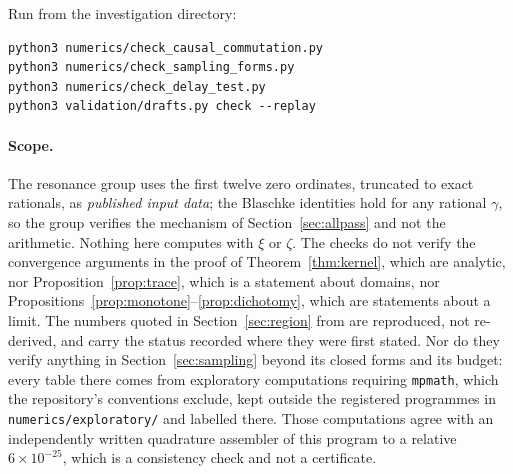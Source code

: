 Run from the investigation directory:
\begin{verbatim}
python3 numerics/check_causal_commutation.py
python3 numerics/check_sampling_forms.py
python3 numerics/check_delay_test.py
python3 validation/drafts.py check --replay
\end{verbatim}

\paragraph{Scope.} The resonance group uses the first twelve zero ordinates,
truncated to exact rationals, as \emph{published input data}; the Blaschke
identities hold for any rational $\gamma$, so the group verifies the mechanism of
Section~\ref{sec:allpass} and not the arithmetic. Nothing here computes with
$\xi$ or $\zeta$. The checks do not verify the convergence arguments in the proof
of Theorem~\ref{thm:kernel}, which are analytic, nor
Proposition~\ref{prop:trace}, which is a statement about domains, nor
Propositions~\ref{prop:monotone}--\ref{prop:dichotomy}, which are statements
about a limit. The numbers quoted in Section~\ref{sec:region} from
\cite{CriticalPath} are reproduced, not re-derived, and carry the status recorded
where they were first stated. Nor do they verify anything in
Section~\ref{sec:sampling} beyond its closed forms and its budget: every table
there comes from exploratory computations requiring \texttt{mpmath}, which the
repository's conventions exclude, kept outside the registered programmes in
\texttt{numerics/exploratory/} and labelled there. Those computations agree with
an independently written quadrature assembler of this program to a relative
$6\times10^{-25}$, which is a consistency check and not a certificate.
